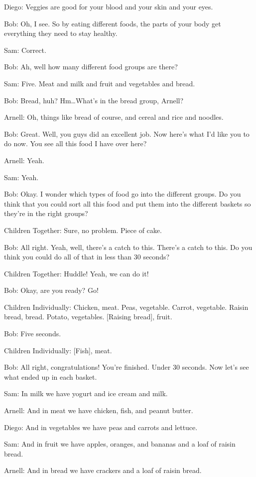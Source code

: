 Diego: Veggies are good for your blood and your skin and your eyes.

Bob: Oh, I see. So by eating different foods, the parts of your body get everything they need to stay healthy.

Sam: Correct.

Bob: Ah, well how many different food groups are there?

Sam: Five. Meat and milk and fruit and vegetables and bread.

Bob: Bread, huh? Hm\dots What's in the bread group, Arnell?

Arnell: Oh, things like bread of course, and cereal and rice and noodles.

Bob: Great. Well, you guys did an excellent job. Now here's what I'd like you to do now. You see all this food I have over here?

Arnell: Yeah.

Sam: Yeah.

Bob: Okay. I wonder which types of food go into the different groups. Do you think that you could sort all this food and put them into the different baskets so they're in the right groups?

Children Together: Sure, no problem. Piece of cake.

Bob: All right. Yeah, well, there's a catch to this. There's a catch to this. Do you think you could do all of that in less than 30 seconds?

Children Together: Huddle! Yeah, we can do it!

Bob: Okay, are you ready? Go!

Children Individually: Chicken, meat. Peas, vegetable. Carrot, vegetable. Raisin bread, bread. Potato, vegetables. [Raising bread], fruit.

Bob: Five seconds.

Children Individually: [Fish], meat.

Bob: All right, congratulations! You're finished. Under 30 seconds. Now let's see what ended up in each basket.

Sam: In milk we have yogurt and ice cream and milk.

Arnell: And in meat we have chicken, fish, and peanut butter.

Diego: And in vegetables we have peas and carrots and lettuce.

Sam: And in fruit we have apples, oranges, and bananas and a loaf of raisin bread.

Arnell: And in bread we have crackers and a loaf of raisin bread.

